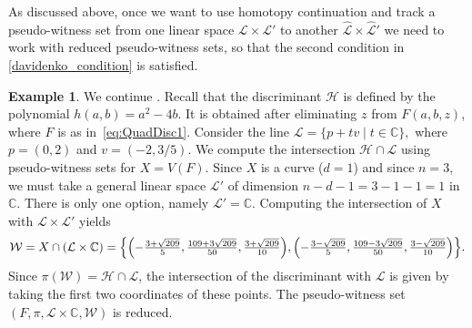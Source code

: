 \documentclass[11pt]{article}
\numberwithin{equation}{section}
\theoremstyle{plain}
\theoremstyle{definition}
\newtheorem{example}[theorem]{Example}
\theoremstyle{remark}
\newcommand{\sH}{{\mathcal H}}
\newcommand\bC{{\mathbb C}}
\begin{document}
As discussed above, once we want to use homotopy continuation and track a pseudo-witness set from one linear space $\mathcal{L}\times \mathcal{L}'$ to another $\hat{\mathcal{L}}\times \hat{\mathcal{L}}'$ we need to work with reduced pseudo-witness sets, so that the second condition in \eqref{davidenko_condition} is satisfied. 

\begin{example}\label{ex:quadratic_discriminant3}
We continue .
Recall that the discriminant $\sH$ is defined by the polynomial $h(a,b) = a^{2} - 4b$. It is obtained after eliminating $z$ from $F(a,b,z)$, where $F$ is as in~\eqref{eq:QuadDisc1}.
Consider the line 
$\mathcal L = \{ p + tv \mid t\in\mathbb C\},$
where $p=(0,2)$ and $v=(-2,3/5)$. We compute the intersection $\sH\cap \mathcal L$ using pseudo-witness sets for $X=V(F)$. Since $X$ is a curve ($d=1$) and since $n = 3$, we must take a general linear space $\mathcal L'$ of dimension $n-d-1=3-1-1=1$ in $\mathbb C$. There is only one option, namely $\mathcal L'=\mathbb C$. Computing the intersection of $X$ with $\mathcal L\times \mathcal L'$ yields 
\begin{equation*}
\mathcal{W}
= X\cap (\mathcal{L} \times \bC)
=
\Bigl\{
\Bigl(-\tfrac{3+\sqrt{209}}{5},\tfrac{109+3\sqrt{209}}{50}, \tfrac{3+\sqrt{209}}{10}\Bigr),
\Bigl(-\tfrac{3-\sqrt{209}}{5},\tfrac{109-3\sqrt{209}}{50}, \tfrac{3-\sqrt{209}}{10}\Bigr)
\Bigr\}.
\end{equation*}
Since $\pi(\mathcal{W}) = \sH \cap \mathcal{L}$, the intersection of the discriminant with $\mathcal{L}$ is given by taking the first two coordinates of these points. The pseudo-witness set $(F,\pi, \mathcal{L} \times \bC, \mathcal W)$ is reduced.
\end{example}
\end{document}
